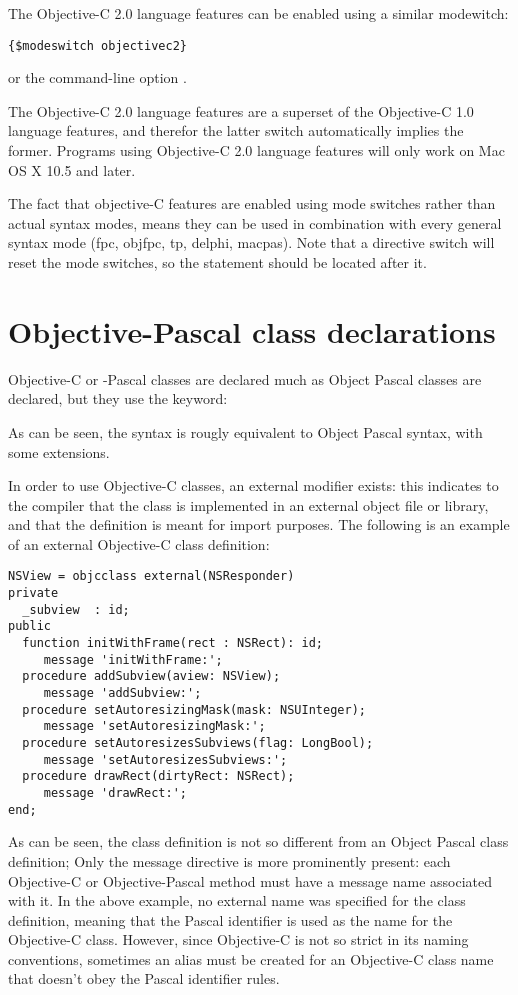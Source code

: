 The Objective-C 2.0 language features can be enabled using a similar
modewitch:
\begin{verbatim}
{$modeswitch objectivec2}
\end{verbatim}
or the command-line option .

The Objective-C 2.0 language features are a superset of the Objective-C 1.0
language features, and therefor the latter switch automatically implies the
former. Programs using Objective-C 2.0 language features will only work on
Mac OS X 10.5 and later.

The fact that objective-C features are enabled using mode switches rather than 
actual syntax modes, means they can be used in combination with every general 
syntax mode (fpc, objfpc, tp, delphi, macpas). Note that a 
directive switch will reset the mode switches, so the 
statement should be located after it.

\section{Objective-Pascal class declarations}
Objective-C or -Pascal classes are declared much as Object Pascal classes are
declared, but they use the  keyword:

As can be seen, the syntax is rougly equivalent to Object Pascal syntax, with some
extensions.

In order to use Objective-C classes, an external modifier exists: this
indicates to the compiler that the class is implemented in an external object
file or library, and that the definition is meant for import purposes.
The following is an example of an external Objective-C class definition:
\begin{verbatim}
NSView = objcclass external(NSResponder)
private
  _subview  : id; 
public
  function initWithFrame(rect : NSRect): id; 
     message 'initWithFrame:';
  procedure addSubview(aview: NSView); 
     message 'addSubview:';
  procedure setAutoresizingMask(mask: NSUInteger); 
     message 'setAutoresizingMask:';
  procedure setAutoresizesSubviews(flag: LongBool); 
     message 'setAutoresizesSubviews:';
  procedure drawRect(dirtyRect: NSRect); 
     message 'drawRect:';
end;
\end{verbatim}
As can be seen, the class definition is not so different from an Object
Pascal class definition; Only the message directive is more prominently
present: each Objective-C or Objective-Pascal method must have a message
name associated with it. In the above example, no external name was 
specified for the class definition, meaning that the Pascal identifier is
used as the name for the Objective-C class. However, since Objective-C is not so
strict in its naming conventions, sometimes an alias must be created for an
Objective-C class name that doesn't obey the Pascal identifier rules. 

